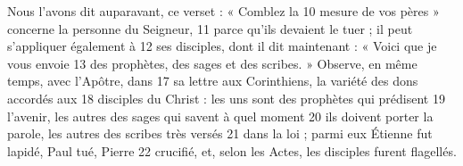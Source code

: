 Nous l'avons dit auparavant, ce verset : « Comblez la	 
10	 	mesure de vos pères » concerne la personne du Seigneur,	 
11	 	parce qu'ils devaient le tuer ; il peut s'appliquer également à	 
12	 	ses disciples, dont il dit maintenant : « Voici que je vous envoie	 
13	 	des prophètes, des sages et des scribes. »
 Observe, en même temps, avec l'Apôtre, dans	 
17	 	sa lettre aux Corinthiens, la variété des dons accordés aux	 
18	 	disciples du Christ : les uns sont des prophètes qui prédisent	 
19	 	l'avenir, les autres des sages qui savent à quel moment	 
20	 	ils doivent porter la parole, les autres des scribes très versés	 
21	 	dans la loi ; parmi eux Étienne fut lapidé, Paul tué, Pierre	 
22	 	crucifié, et, selon les Actes, les disciples furent flagellés.